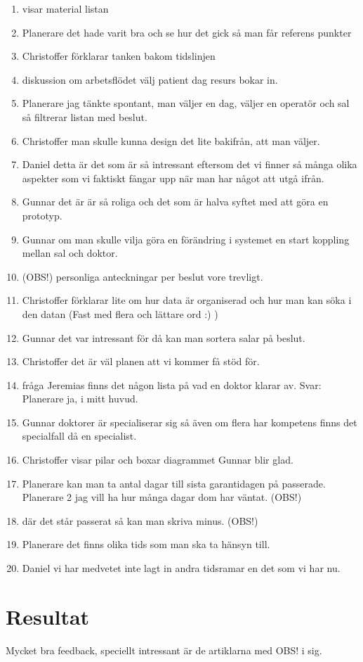 \documentclass[a4paper,10pt, twoside]{article}
\begin{document}
\begin{enumerate}
    \item visar material listan
    \item Planerare det hade varit bra och se hur det gick så man får referens punkter
    \item Christoffer förklarar tanken bakom tidslinjen
    \item diskussion om arbetsflödet välj patient dag resurs bokar in.
    \item Planerare jag tänkte spontant, man väljer en dag, väljer en operatör och sal så filtrerar listan med beslut.
    \item Christoffer man skulle kunna design det lite bakifrån, att man väljer.
    \item Daniel detta är det som är så intressant eftersom det vi finner så många olika aspekter som vi faktiskt fångar upp när man har något att utgå ifrån.
    \item Gunnar det är är så roliga och det som är halva syftet med att göra en prototyp.
    \item Gunnar om man skulle vilja göra en förändring i systemet en start koppling mellan sal och doktor.
    \item (OBS!) personliga anteckningar per beslut vore trevligt.
    \item Christoffer förklarar lite om hur data är organiserad och hur man kan söka i den datan (Fast med flera och lättare ord :) )
    \item Gunnar det var intressant för då kan man sortera salar på beslut.
    \item Christoffer det är väl planen att vi kommer få stöd för.
    \item fråga Jeremias finns det någon lista på vad en doktor klarar av. Svar: Planerare ja, i mitt huvud.
    \item Gunnar doktorer är specialiserar sig så även om flera har kompetens finns det specialfall då en specialist.
    \item Christoffer visar pilar och boxar diagrammet Gunnar blir glad.
    \item Planerare kan man ta antal dagar till sista garantidagen på passerade. Planerare 2 jag vill ha hur många dagar dom har väntat. (OBS!)
    \item där det står passerat så kan man skriva minus. (OBS!)
    \item Planerare det finns olika tids som man ska ta hänsyn till.
    \item Daniel  vi har medvetet inte lagt in andra tidsramar en det som vi har nu.
\end{enumerate}

\section{Resultat}
Mycket bra feedback, speciellt intressant är de artiklarna med OBS! i sig.
\end{document}
